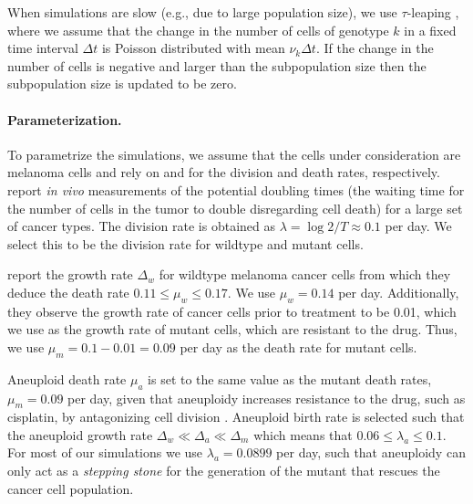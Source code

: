 \documentclass[12pt]{extarticle}
\begin{document}
When simulations are slow (e.g., due to large population size), we use $\tau$-leaping \citep{gillespie2001approximate}, where we assume that the change in the number of cells of genotype $k$ in a fixed time interval $\Delta t$ is Poisson distributed with mean $\nu_k \Delta t$. If the change in the number of cells is negative and larger than the subpopulation size then the subpopulation size is updated to be zero. 



\paragraph{Parameterization.}
To parametrize the simulations, we assume that the cells under consideration are melanoma cells and rely on \citet{rew2000cell} and \citet{bozic2013evolutionary} for the division and death rates, respectively. 
\citet{rew2000cell} report \emph{in vivo} measurements of the potential doubling times (the waiting time for the number of cells in the tumor to double disregarding cell death) for a large set of cancer types. The division rate is obtained as $\lambda=\log{2} / T \approx 0.1$ per day. We select this to be the division rate for wildtype and mutant cells. %

\citet{bozic2013evolutionary} report the growth rate $\Delta_w$ for wildtype melanoma cancer cells from which they deduce the death rate $0.11 \le \mu_w \le 0.17$. We use  $\mu_w=0.14$ per day. Additionally, they observe the growth rate of cancer cells prior to treatment to be 0.01, which we use as the growth rate of mutant cells, which are resistant to the drug. Thus, we use $\mu_m=0.1-0.01=0.09$ per day as the death rate for mutant cells.

 Aneuploid death rate $\mu_a$ is set to the same value as the mutant death rates, $\mu_m=0.09$ per day, given that aneuploidy increases resistance to the drug, such as cisplatin, by antagonizing cell division \citep{replogle2020aneuploidy}. Aneuploid birth rate is selected such that the aneuploid growth rate $\Delta_w\ll\Delta_a\ll\Delta_m$ which means that $0.06 \le \lambda_a \le 0.1$. For most of our simulations we use $\lambda_a=0.0899$ per day, such that aneuploidy can only act as a \emph{stepping stone} for the generation of the mutant that rescues the cancer cell population.
\end{document}

